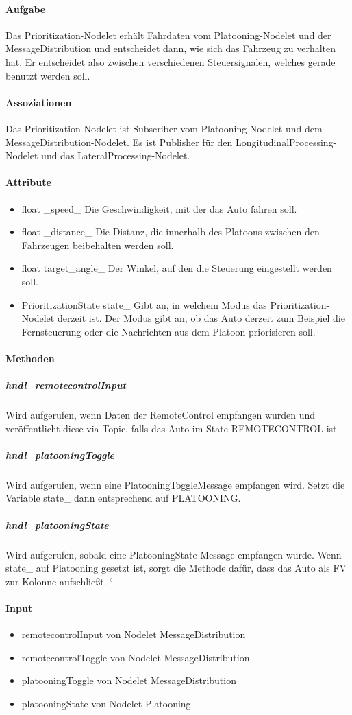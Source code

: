 \documentclass[a4paper, 12pt, titlepage]{scrartcl}
\begin{document}
				\paragraph{Aufgabe} Das Prioritization-Nodelet erhält Fahrdaten vom Platooning-Nodelet und der MessageDistribution und entscheidet dann, wie sich das Fahrzeug zu verhalten hat. Er entscheidet also zwischen verschiedenen Steuersignalen, welches gerade benutzt werden soll.
				\paragraph{Assoziationen} Das Prioritization-Nodelet ist Subscriber vom Platooning-Nodelet und dem MessageDistribution-Nodelet. Es ist Publisher für den LongitudinalProcessing-Nodelet und das LateralProcessing-Nodelet.
				\paragraph{Attribute}
					\begin{itemize}
						\item float \_speed\_ Die Geschwindigkeit, mit der das Auto fahren soll.
						\item float \_distance\_ Die Distanz, die innerhalb des Platoons zwischen den Fahrzeugen beibehalten werden soll.
						\item float target\_angle\_ Der Winkel, auf den die Steuerung eingestellt werden soll.
						\item PrioritizationState state\_ Gibt an, in welchem Modus das Prioritization-Nodelet derzeit ist. Der Modus gibt an, ob das Auto derzeit zum Beispiel die Fernsteuerung oder die Nachrichten aus dem Platoon priorisieren soll.
					\end{itemize}
				\paragraph{Methoden}
					\subparagraph{hndl\_remotecontrolInput} Wird aufgerufen, wenn Daten der RemoteControl empfangen wurden und veröffentlicht diese via Topic, falls das Auto im State REMOTECONTROL ist.
					\subparagraph{hndl\_platooningToggle} Wird aufgerufen, wenn eine PlatooningToggleMessage empfangen wird. Setzt die Variable state\_ dann entsprechend auf PLATOONING.
					\subparagraph{hndl\_platooningState} Wird aufgerufen, sobald eine PlatooningState Message empfangen wurde. Wenn state\_ auf Platooning gesetzt ist, sorgt die Methode dafür, dass das Auto als FV zur Kolonne aufschließt. ‘
				\paragraph{Input}
				    \begin{itemize}
				        \item remotecontrolInput von Nodelet MessageDistribution
				        \item remotecontrolToggle von Nodelet MessageDistribution
				        \item platooningToggle von Nodelet MessageDistribution
				        \item platooningState von Nodelet Platooning
				    \end{itemize}
\end{document}
